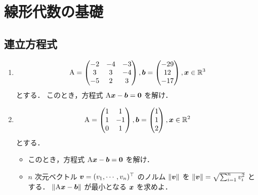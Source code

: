 \section{線形代数の基礎 \label{sec:linalg}}

\subsection{連立方程式 \label{linalg:linear_system}}

  \vspace{1mm}
  \begin{enumerate}[label=(\roman*)]
    \item
    \begin{equation}
      \mathrm{A} =
        \begin{pmatrix}
          -2 & -4 & -3 \\
           3 &  3 & -4 \\
          -5 &  2 &  3
        \end{pmatrix},
      \boldsymbol{b} =
        \begin{pmatrix}
          -29 \\
           12 \\
          -17
        \end{pmatrix},
      \boldsymbol{x} \in \mathbb{R}^3
    \end{equation}
    とする．
    このとき，方程式 $\mathrm{A} \boldsymbol{x} - \boldsymbol{b} = \boldsymbol{0}$ を解け．
    
    \item
    \begin{equation}
      \mathrm{A} =
        \begin{pmatrix}
           1 & 1 \\ 1 & -1 \\ 0 & 1
        \end{pmatrix},
      \boldsymbol{b} =
        \begin{pmatrix}
           1 \\
           1 \\
           2
        \end{pmatrix},
      \boldsymbol{x} \in \mathbb{R}^2
    \end{equation}
    とする．
    \begin{itemize}
      \item このとき，方程式 $\mathrm{A} \boldsymbol{x} - \boldsymbol{b} = \boldsymbol{0}$ を解け．
      \item $n$ 次元ベクトル $\boldsymbol{v} = (v_1, \cdots, v_n)^\top$ のノルム $\| \boldsymbol{v} \|$ を
        $\| \boldsymbol{v} \| = \sqrt{\sum_{i=1}^n v_i^2}$ とする．
        $\|\mathrm{A} \boldsymbol{x} - \boldsymbol{b} \|$ が最小となる $\boldsymbol{x}$ を求めよ．
    \end{itemize}
    

\end{enumerate}
